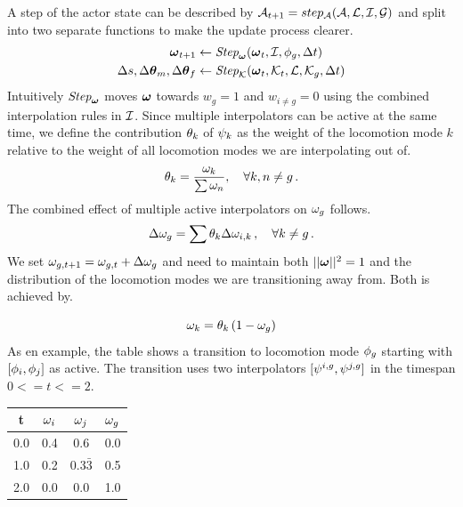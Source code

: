 A step of the actor state can be described by $\mathcal{A}_{t+1} = step_{\mathcal{A}}(\mathcal{A}, \mathcal{L}, \mathcal{I}, \mathcal{G})$ and split into two separate functions to make the update process clearer.
\begin{subequations}
\begin{align}
    \boldsymbol{\omega }_{t+1} &\leftarrow \textit{Step}_{\boldsymbol{\omega }}( \boldsymbol{\omega }_{t}, \mathcal{I}, \phi_g, \Delta{t}) \label{eq:step:interpolators}\\
    \Delta{s}, {\Delta{ \boldsymbol{\theta } }_m}, {\Delta{ \boldsymbol{\theta } }_f} &\leftarrow  \textit{Step}_{\mathcal{K}}(\boldsymbol{\omega }_t, \mathcal{K}_{t},  \mathcal{L}, \mathcal{K}_{g}, \Delta{t} )\label{eq:step:modes}
\end{align}
\end{subequations}
Intuitively $\textit{Step}_{\boldsymbol{\omega }}$ moves $\boldsymbol{\omega }$ towards $w_g=1$ and $w_{i\neq{g}}=0$ using the combined interpolation rules in $\mathcal{I}$. Since multiple interpolators can be active at the same time, we define the contribution $\theta_k$ of $\psi_k$ as the weight of the locomotion mode $k$ relative to the weight of all locomotion modes we are interpolating out of. 
\begin{equation}
\theta_{k}=\dfrac{\omega_k}{\sum{ \omega _n}},
\quad \forall k, n \neq g \,.
\end{equation}
The combined effect of multiple active interpolators on $\omega_g$ follows.
\begin{equation}
\Delta{ \omega }_g = \sum \theta_k \Delta{ \omega }_{i,k} \,,
\quad \forall k \neq g \,.
\end{equation}
We set $\omega_{g,t+1}=\omega_{g,t}+\Delta{ \omega }_g$ and need to maintain both $||\boldsymbol{\omega }||^2=1$ and the distribution of the locomotion modes we are transitioning away from. Both is achieved by.

\begin{equation}
\omega_k = \theta_k \, (1-\omega_g)  
\end{equation}
As en example, the table shows a transition to locomotion mode $\phi_g$ starting with $[\phi_i,\phi_j]$ as active. The transition uses two interpolators $[\psi^{i,g},\psi^{j,g}]$ in the timespan $0<=t<=2$.
\begin{center}
 \begin{tabular}{||c c c c||} 
 \hline
 t & $\omega_i$ & $\omega_j$ & $\omega_g$  \\ [0.5pt] 
 \hline\hline
 0.0 & 0.4 & 0.6 & 0.0 \\ 
 \hline
 1.0 & 0.2 & 0.3$\bar{3}$ & 0.5 \\
 \hline
 2.0  & 0.0 & 0.0 & 1.0 \\
 \hline
\end{tabular}
\end{center}

